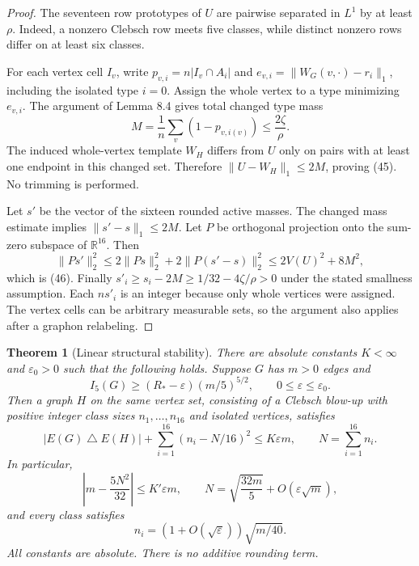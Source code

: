 \documentclass[11pt]{amsart}
\newtheorem{theorem}{Theorem}[section]
\theoremstyle{definition}
\theoremstyle{remark}
\begin{document}
\begin{proof}
The seventeen row prototypes of $U$ are pairwise separated in $L^1$ by at
least $\rho$. Indeed, a nonzero Clebsch row meets five classes, while distinct
nonzero rows differ on at least six classes.

For each vertex cell $I_v$, write $p_{v,i}=n|I_v\cap A_i|$ and
$e_{v,i}=\|W_G(v,\cdot)-r_i\|_1$, including the isolated type $i=0$.
Assign the whole vertex to a type minimizing $e_{v,i}$. The argument of
Lemma 8.4 gives total changed type mass
\[
 M=\frac1n\sum_v(1-p_{v,i(v)})\leq\frac{2\zeta}{\rho}.
\]
The induced whole-vertex template $W_H$ differs from $U$ only on pairs
with at least one endpoint in this changed set. Therefore
$\|U-W_H\|_1\leq2M$, proving (45). No trimming is performed.

Let $s'$ be the vector of the sixteen rounded active masses. The changed
mass estimate implies $\|s'-s\|_1\leq2M$. Let $P$ be orthogonal projection
onto the sum-zero subspace of $\mathbb R^{16}$. Then
\[
 \|Ps'\|_2^2\leq2\|Ps\|_2^2+2\|P(s'-s)\|_2^2
 \leq2V(U)^2+8M^2,
\]
which is (46). Finally
$s'_i\geq s_i-2M\geq1/32-4\zeta/\rho>0$ under the stated smallness
assumption. Each $ns'_i$ is an integer because only whole vertices were
assigned. The vertex cells can be arbitrary measurable sets, so the argument
also applies after a graphon relabeling.
\end{proof}

\begin{theorem}[Linear structural stability]\label{thm:linear-stability}
There are absolute constants $K<\infty$ and $\varepsilon_0>0$ such that the
following holds. Suppose $G$ has $m>0$ edges and
\[
 I_5(G)\geq(R_\ast-\varepsilon)(m/5)^{5/2},\qquad
 0\leq\varepsilon\leq\varepsilon_0.
\]
Then a graph $H$ on the same vertex set, consisting of a Clebsch blow-up with
positive integer class sizes $n_1,\ldots,n_{16}$ and isolated vertices,
satisfies
\begin{equation}\tag{47}\label{eq:47}
 |E(G)\mathbin{\triangle}E(H)|+\sum_{i=1}^{16}(n_i-N/16)^2
 \leq K\varepsilon m,\qquad N=\sum_{i=1}^{16}n_i.
\end{equation}
In particular,
\begin{equation}\tag{48}\label{eq:48}
 \left|m-\frac{5N^2}{32}\right|\leq K'\varepsilon m,\qquad
 N=\sqrt{\frac{32m}5}+O(\varepsilon\sqrt m),
\end{equation}
and every class satisfies
\[
 n_i=(1+O(\sqrt\varepsilon))\sqrt{m/40}.
\]
All constants are absolute. There is no additive rounding term.
\end{theorem}
\end{document}
